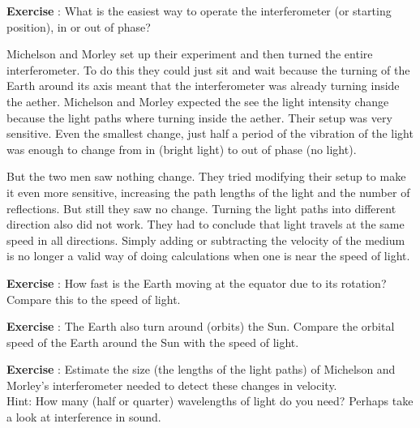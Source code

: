 \documentclass[12pt,a4paper]{article}
\numberwithin{equation}{section}
\numberwithin{figure}{section}
\newcounter{Exercise}
\numberwithin{table}{section}
\begin{document}
\begin{shaded}
\textbf{Exercise \theExercise {}} : What is the easiest way to operate the interferometer (or starting position), in or out of phase?\end{shaded}

Michelson and Morley set up their experiment and then turned the entire interferometer. To do this they could just sit and wait because the turning of the Earth around its axis meant that the interferometer was already turning inside the aether. Michelson and Morley expected the see the light intensity change because the light paths where turning inside the aether. Their setup was very sensitive. Even the smallest change, just half a period of the vibration of the light was enough to change from in (bright light) to out of phase (no light).

But the two men saw nothing change. They tried modifying their setup to make it even more sensitive, increasing the path lengths of the light and the number of reflections. But still they saw no change. Turning the light paths into different direction also did not work. They had to conclude that light travels at the same speed in all directions. Simply adding or subtracting the velocity of the medium is no longer a valid way of doing calculations when one is near the speed of light.

\begin{shaded}
\textbf{Exercise \theExercise {}} : How fast is the Earth moving at the equator due to its rotation? Compare this to the speed of light.\end{shaded}
\begin{shaded}
\textbf{Exercise \theExercise {}} : The Earth also turn around (orbits) the Sun. Compare the orbital speed of the Earth around the Sun with the speed of light.\end{shaded}
\begin{shaded}
\textbf{Exercise \theExercise {}} : Estimate the size (the lengths of the light paths) of Michelson and Morley's interferometer needed to detect these changes in velocity.\\
Hint: How many (half or quarter) wavelengths of light do you need? Perhaps take a look at interference in sound.\end{shaded}
\end{document}
